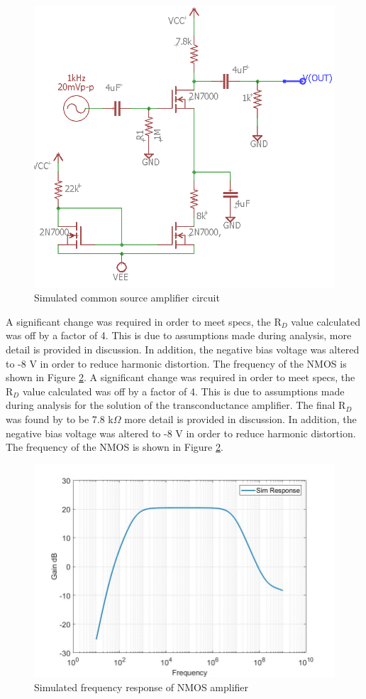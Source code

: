 	\begin{figure}[H]
		\centering
		\includegraphics[width=.55\textwidth]{CircuitDevelopment/NMOS_sim.png}
		\caption{Simulated common source amplifier circuit}
		\label{fig:NMOSsimcircuit}
	\end{figure}

	A significant change was required in order to meet specs, the R$_D$ value calculated was off by a factor of 4. This is due to assumptions made during analysis, more detail is provided in discussion. In addition, the negative bias voltage was altered to -8 V in order to reduce harmonic distortion. The frequency of the NMOS is shown in Figure \ref{fig:NMOSfreq}.
	A significant change was required in order to meet specs, the R$_D$ value calculated was off by a factor of 4. This is due to assumptions made during analysis for the solution of the transconductance amplifier. The final R$_D$ was found by to be 7.8 k$\Omega$ more detail is provided in discussion. In addition, the negative bias voltage was altered to -8 V in order to reduce harmonic distortion. The frequency of the NMOS is shown in Figure \ref{fig:NMOSfreq}.
	
\begin{figure}[H]
		\centering
		\includegraphics[width=.55\textwidth]{CircuitDevelopment/NMOS_bandwidth.jpg}
		\caption{Simulated frequency response of NMOS amplifier}
		\label{fig:NMOSfreq}
\end{figure}

